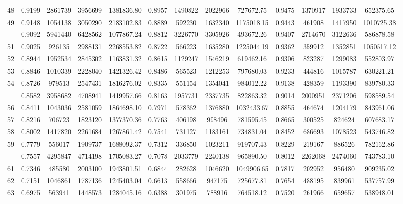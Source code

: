 \documentclass[
  12pt,
]{article}
\begin{document}
\begin{longtable}[t]{lcccccccccccc}
48 & 0.9199 & 2861739 & 3956699 & 1381836.80 & 0.8957 & 1490822 & 2022966 & 727672.75 & 0.9475 & 1370917 & 1933733 & 652375.65\\
49 & 0.9148 & 1054138 & 3050290 & 2183102.83 & 0.8889 & 592230 & 1632340 & 1175018.15 & 0.9443 & 461908 & 1417950 & 1010725.38\\
\addlinespace
50 & 0.9092 & 5941440 & 6428562 & 1077867.24 & 0.8812 & 3226770 & 3305926 & 493672.26 & 0.9407 & 2714670 & 3122636 & 586878.58\\
51 & 0.9025 & 926135 & 2988131 & 2268553.82 & 0.8722 & 566223 & 1635280 & 1225044.19 & 0.9362 & 359912 & 1352851 & 1050517.12\\
52 & 0.8944 & 1952534 & 2845302 & 1163831.32 & 0.8615 & 1129247 & 1546219 & 619462.16 & 0.9306 & 823287 & 1299083 & 552803.97\\
53 & 0.8846 & 1010339 & 2228040 & 1421326.42 & 0.8486 & 565523 & 1212253 & 797680.03 & 0.9233 & 444816 & 1015787 & 630221.21\\
54 & 0.8726 & 979513 & 2547431 & 1816276.02 & 0.8335 & 551154 & 1354041 & 984012.22 & 0.9138 & 428359 & 1193390 & 839780.33\\
\addlinespace
55 & 0.8582 & 3958682 & 4708941 & 1419957.66 & 0.8163 & 1957731 & 2337735 & 822863.32 & 0.9014 & 2000951 & 2371206 & 598589.54\\
56 & 0.8411 & 1043036 & 2581059 & 1864698.10 & 0.7971 & 578362 & 1376880 & 1032433.67 & 0.8855 & 464674 & 1204179 & 843961.06\\
57 & 0.8216 & 706723 & 1823120 & 1377370.36 & 0.7763 & 406198 & 998496 & 781595.45 & 0.8665 & 300525 & 824624 & 607683.17\\
58 & 0.8002 & 1417820 & 2261684 & 1267861.42 & 0.7541 & 731127 & 1183161 & 734831.04 & 0.8452 & 686693 & 1078523 & 543746.82\\
59 & 0.7779 & 556017 & 1909737 & 1688092.37 & 0.7312 & 336850 & 1023211 & 919707.43 & 0.8229 & 219167 & 886526 & 782162.86\\
\addlinespace
60 & 0.7557 & 4295847 & 4714198 & 1705083.27 & 0.7078 & 2033779 & 2240138 & 965890.50 & 0.8012 & 2262068 & 2474060 & 743783.10\\
61 & 0.7346 & 485580 & 2003100 & 1943801.51 & 0.6844 & 282628 & 1046620 & 1049906.65 & 0.7817 & 202952 & 956480 & 909235.02\\
62 & 0.7151 & 1046861 & 1787136 & 1245403.04 & 0.6613 & 558666 & 947175 & 725677.81 & 0.7654 & 488195 & 839961 & 537757.99\\
63 & 0.6975 & 563941 & 1448573 & 1284045.16 & 0.6388 & 301975 & 788916 & 764518.12 & 0.7520 & 261966 & 659657 & 538948.01\\

\end{longtable}
\end{document}
